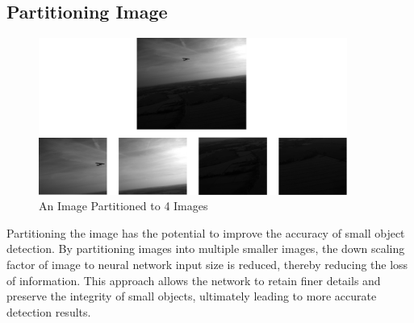   \subsection{Partitioning Image}
  \begin{figure}[H]
    \centering
    \includegraphics[width=0.9\textwidth]{figures/imagepartition.png}
    \caption{An Image Partitioned to 4 Images}
    \label{fig:imagepartition}
  \end{figure}
  Partitioning the image has the potential to improve the accuracy of small object detection.
  By partitioning images into multiple smaller images, the down scaling factor of image to neural network input size is reduced, thereby reducing the loss of information.
  This approach allows the network to retain finer details and preserve the integrity of small objects, ultimately leading to more accurate detection results.

